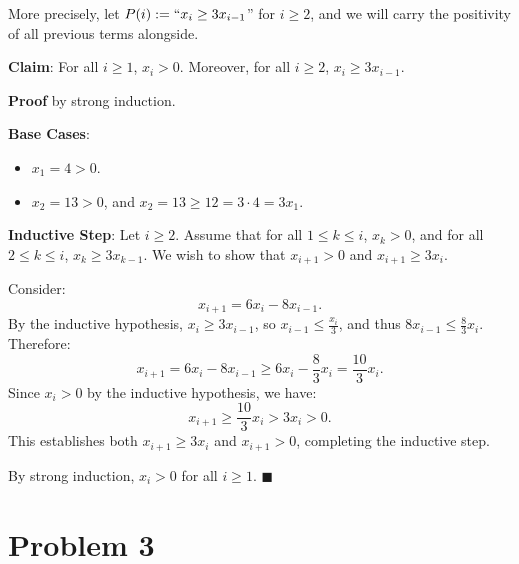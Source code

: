 \documentclass[11pt]{article}
\begin{document}
\begin{enumerate}[label=\textbf{(\alph*)}]
More precisely, let $P(i) := ``x_i \geq 3x_{i-1}$'' for $i \geq 2$, and we will
carry the positivity of all previous terms alongside.

\textbf{Claim}: For all $i \geq 1$, $x_i > 0$. Moreover, for all $i \geq 2$,
$x_i \geq 3x_{i-1}$.

\textbf{Proof} by strong induction.

\textbf{Base Cases}:
\begin{itemize}
    \item $x_1 = 4 > 0$. \checkmark
    \item $x_2 = 13 > 0$, and $x_2 = 13 \geq 12 = 3 \cdot 4 = 3x_1$. \checkmark
\end{itemize}

\textbf{Inductive Step}: Let $i \geq 2$. Assume that for all $1 \leq k \leq i$,
$x_k > 0$, and for all $2 \leq k \leq i$, $x_k \geq 3x_{k-1}$. We wish to show that
$x_{i+1} > 0$ and $x_{i+1} \geq 3x_i$.

Consider:
\[
    x_{i+1} = 6x_i - 8x_{i-1}.
\]
By the inductive hypothesis, $x_i \geq 3x_{i-1}$, so $x_{i-1} \leq \frac{x_i}{3}$,
and thus $8x_{i-1} \leq \frac{8}{3}x_i$. Therefore:
\[
    x_{i+1} = 6x_i - 8x_{i-1} \geq 6x_i - \frac{8}{3}x_i = \frac{10}{3}x_i.
\]
Since $x_i > 0$ by the inductive hypothesis, we have:
\[
    x_{i+1} \geq \frac{10}{3}x_i > 3x_i > 0.
\]
This establishes both $x_{i+1} \geq 3x_i$ and $x_{i+1} > 0$, completing the
inductive step.

By strong induction, $x_i > 0$ for all $i \geq 1$. $\blacksquare$

\end{enumerate}

\section*{Problem 3}
\end{document}

